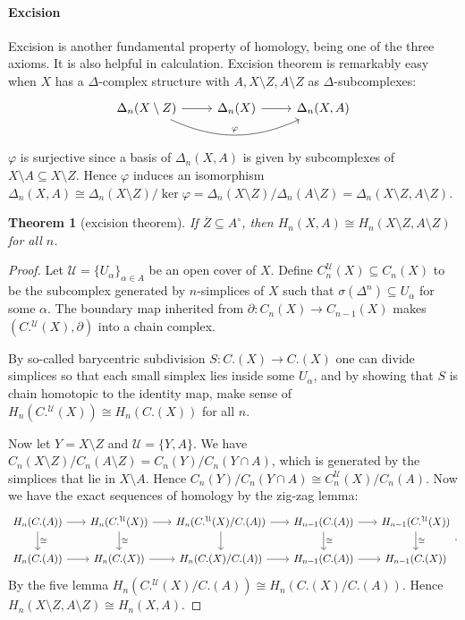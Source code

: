 \documentclass[11pt]{article}
\theoremstyle{definition}
\theoremstyle{plain}
\newtheorem{theorem}{Theorem}[section]
\begin{document}
\paragraph{Excision} Excision is another fundamental property of homology, being one of the three axioms. It is also helpful in calculation. Excision theorem is remarkably easy when $X$ has a $\Delta$-complex structure with $A,X\setminus Z,A\setminus Z$ as $\Delta$-subcomplexes:
\[\begin{tikzcd}
\Delta_n(X\setminus Z)\arrow[bend right=25]{rr}{\varphi}\arrow{r}&\Delta_n(X)\arrow[r]&\Delta_n(X,A)
\end{tikzcd}\]
$\varphi$ is surjective since a basis of $\Delta_n(X,A)$ is given by subcomplexes of $X\setminus A\subseteq X\setminus Z$. Hence $\varphi$ induces an isomorphism $\Delta_n(X,A)\cong\Delta_n(X\setminus Z)/\ker\varphi=\Delta_n(X\setminus Z)/\Delta_n(A\setminus Z)=\Delta_n(X\setminus Z,A\setminus Z)$.

\begin{theorem}[excision theorem]
If $\overline{Z}\subseteq A^\circ$, then $H_n(X,A)\cong H_n(X\setminus Z,A\setminus Z)$ for all $n$.
\end{theorem}
\begin{proof}
Let $\mathcal{U}=\{U_\alpha\}_{\alpha\in A}$ be an open cover of $X$. Define $C_n^\mathcal{U}(X)\subseteq C_n(X)$ to be the subcomplex generated by $n$-simplices of $X$ such that $\sigma(\Delta^n)\subseteq U_\alpha$ for some $\alpha$. The boundary map inherited from $\partial:C_n(X)\to C_{n-1}(X)$ makes $(C.^\mathcal{U}(X),\partial)$ into a chain complex.\medbreak

By so-called barycentric subdivision $S:C.(X)\to C.(X)$ one can divide simplices so that each small simplex lies inside some $U_\alpha$, and by showing that $S$ is chain homotopic to the identity map, make sense of $H_n(C.^\mathcal{U}(X))\cong H_n(C.(X))$ for all $n$.\medbreak

Now let $Y=X\setminus Z$ and $\mathcal{U}=\{Y,A\}$. We have $C_n(X\setminus Z)/C_n(A\setminus Z)=C_n(Y)/C_n(Y\cap A)$, which is generated by the simplices that lie in $X\setminus A$. Hence $C_n(Y)/C_n(Y\cap A)\cong C_n^\mathcal{U}(X)/C_n(A)$. Now we have the exact sequences of homology by the zig-zag lemma:
\[\begin{tikzcd}[column sep=scriptsize]
H_n(C.(A))\arrow{d}{\cong}\arrow[r]&H_n(C.^\mathcal{U}(X))\arrow{d}{\cong}\arrow[r]&H_n(C.^\mathcal{U}(X)/C.(A))\arrow[d]\arrow[r]&H_{n-1}(C.(A))\arrow{d}{\cong}\arrow[r]&H_{n-1}(C.^\mathcal{U}(X))\arrow{d}{\cong}\\
H_n(C.(A))\arrow[r]&H_n(C.(X))\arrow[r]&H_n(C.(X)/C.(A))\arrow[r]&H_{n-1}(C.(A))\arrow[r]&H_{n-1}(C.(X))
\end{tikzcd}.\]
By the five lemma $H_n(C.^\mathcal{U}(X)/C.(A))\cong H_n(C.(X)/C.(A))$. Hence $H_n(X\setminus Z,A\setminus Z)\cong H_n(X,A)$.
\end{proof}
\end{document}
